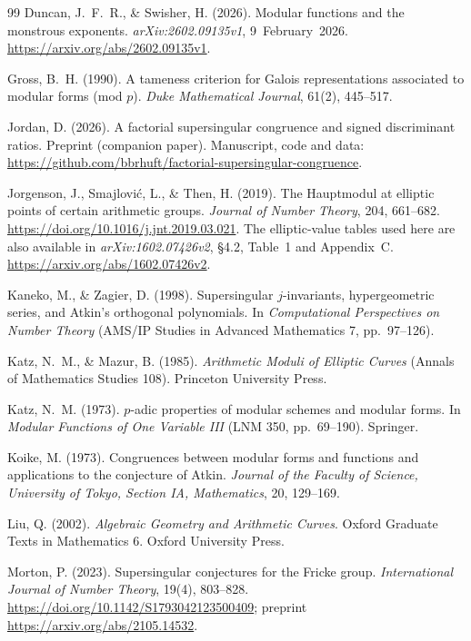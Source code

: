 \documentclass[11pt,a4paper]{article}
\numberwithin{equation}{section}
\theoremstyle{definition}
\theoremstyle{remark}
\begin{document}
\begin{thebibliography}{99}
 Duncan, J.~F.~R., \& Swisher, H. (2026).
Modular functions and the monstrous exponents. \emph{arXiv:2602.09135v1}, 9~February~2026. \url{https://arxiv.org/abs/2602.09135v1}.


 Gross, B.~H. (1990). A tameness criterion for Galois representations associated to modular forms (mod $p$). \emph{Duke Mathematical Journal}, 61(2), 445--517.


 Jordan, D. (2026). A factorial supersingular congruence and
signed discriminant ratios. Preprint (companion paper). Manuscript, code and data: \url{https://github.com/bbrhuft/factorial-supersingular-congruence}.

 Jorgenson, J., Smajlovi\'c, L., \& Then, H. (2019).
The Hauptmodul at elliptic points of certain arithmetic groups.
\emph{Journal of Number Theory}, 204, 661--682.
\url{https://doi.org/10.1016/j.jnt.2019.03.021}.
The elliptic-value tables used here are also available in
\emph{arXiv:1602.07426v2}, \S4.2, Table~1 and Appendix~C.
\url{https://arxiv.org/abs/1602.07426v2}.


 Kaneko, M., \& Zagier, D. (1998). Supersingular $j$-invariants,
hypergeometric series, and Atkin's orthogonal polynomials. In \emph{Computational Perspectives on Number
Theory} (AMS/IP Studies in Advanced Mathematics 7, pp.~97--126).


 Katz, N.~M., \& Mazur, B. (1985). \emph{Arithmetic Moduli of Elliptic
Curves} (Annals of Mathematics Studies 108). Princeton University Press.


 Katz, N.~M. (1973). $p$-adic properties of modular schemes and modular forms.
In \emph{Modular Functions of One Variable III} (LNM 350, pp.~69--190). Springer.


 Koike, M. (1973). Congruences between modular forms
and functions and applications to the conjecture of Atkin.
\emph{Journal of the Faculty of Science, University of Tokyo, Section IA, Mathematics},
20, 129--169.


 Liu, Q. (2002). \emph{Algebraic Geometry and Arithmetic Curves}. Oxford Graduate Texts in Mathematics 6. Oxford University Press.


 Morton, P. (2023). Supersingular conjectures for the
Fricke group. \emph{International Journal of Number Theory}, 19(4), 803--828.
\url{https://doi.org/10.1142/S1793042123500409}; preprint
\url{https://arxiv.org/abs/2105.14532}.



\end{thebibliography}
\end{document}
